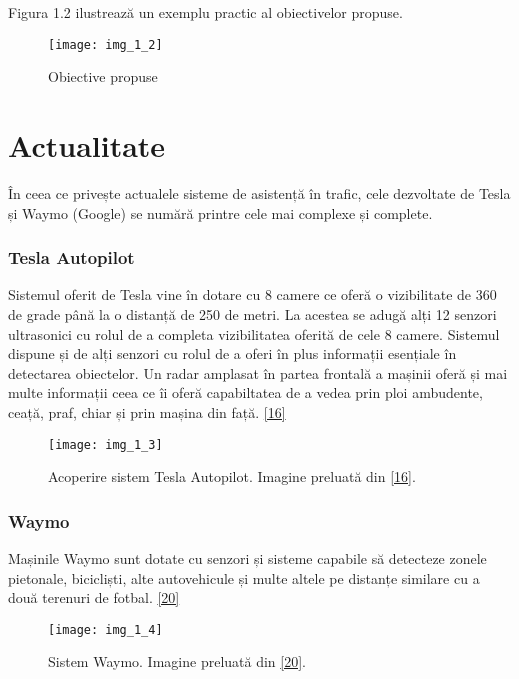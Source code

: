 Figura 1.2 ilustrează un exemplu practic al obiectivelor propuse.
\begin{figure}[!h]
	\centering
	\texttt{[image: img\_1\_2]}
	\caption{Obiective propuse}
\end{figure} 

\section{Actualitate}

În ceea ce privește actualele sisteme de asistență în trafic, cele dezvoltate de Tesla și Waymo (Google) se numără printre cele mai complexe și complete.

\subsubsection{Tesla Autopilot}

Sistemul oferit de Tesla vine în dotare cu 8 camere ce oferă o vizibilitate de 360 de grade până la o distanță de 250 de metri. La acestea se adugă alți 12 senzori ultrasonici cu rolul de a completa vizibilitatea oferită de cele 8 camere. Sistemul dispune și de alți senzori cu rolul de a oferi în plus informații esențiale în detectarea obiectelor. Un radar amplasat în partea frontală a mașinii oferă și mai multe informații ceea ce îi oferă capabiltatea de a vedea prin ploi ambudente, ceață, praf, chiar și prin mașina din față. \hyperlink{TeslaAutopilotSystem}{[16]}

\begin{figure}[!h]
	\centering
	\texttt{[image: img\_1\_3]}
	\caption[Acoperire sistem Tesla Autopilot]{Acoperire sistem Tesla Autopilot. Imagine preluată din \hyperlink{TeslaAutopilotSystem}{[16]}.}
\end{figure} 

\subsubsection{Waymo}

Mașinile Waymo sunt dotate cu senzori și sisteme capabile să detecteze zonele pietonale, bicicliști, alte autovehicule și multe altele pe distanțe similare cu a două terenuri de fotbal. \hyperlink{WaymoSystem}{[20]}

\begin{figure}[!h]
	\centering
	\texttt{[image: img\_1\_4]}
	\caption[Sistem Waymo]{Sistem Waymo. Imagine preluată din \hyperlink{WaymoSystem}{[20]}.}
\end{figure} 


